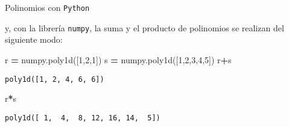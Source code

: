 \documentclass[
  ignorenonframetext,
]{beamer}
\newenvironment{Shaded}{\begin{snugshade}}{\end{snugshade}}
\newcommand{\DecValTok}[1]{\textcolor[rgb]{0.00,0.00,0.81}{#1}}
\newcommand{\NormalTok}[1]{#1}
\newcommand{\OperatorTok}[1]{\textcolor[rgb]{0.81,0.36,0.00}{\textbf{#1}}}
\begin{document}
\begin{frame}[fragile]{Polinomios con \texttt{Python}}
\protect\hypertarget{polinomios-con-python-8}{}

y, con la librería \texttt{numpy}, la suma y el producto de polinomios
se realizan del siguiente modo:

\begin{Shaded}
\begin{Highlighting}[]
\NormalTok{r }\OperatorTok{=}\NormalTok{ numpy.poly1d([}\DecValTok{1}\NormalTok{,}\DecValTok{2}\NormalTok{,}\DecValTok{1}\NormalTok{]) }
\NormalTok{s }\OperatorTok{=}\NormalTok{ numpy.poly1d([}\DecValTok{1}\NormalTok{,}\DecValTok{2}\NormalTok{,}\DecValTok{3}\NormalTok{,}\DecValTok{4}\NormalTok{,}\DecValTok{5}\NormalTok{])}
\NormalTok{r}\OperatorTok{+}\NormalTok{s}
\end{Highlighting}
\end{Shaded}

\begin{verbatim}
poly1d([1, 2, 4, 6, 6])
\end{verbatim}

\begin{Shaded}
\begin{Highlighting}[]
\NormalTok{r}\OperatorTok{*}\NormalTok{s}
\end{Highlighting}
\end{Shaded}

\begin{verbatim}
poly1d([ 1,  4,  8, 12, 16, 14,  5])
\end{verbatim}

\end{frame}
\end{document}
